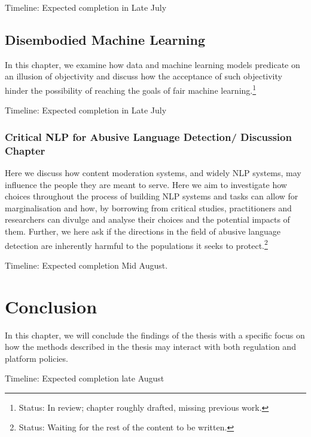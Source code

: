 {Timeline: Expected completion in Late July

\subsection{Disembodied Machine Learning}
In this chapter, we examine how data and machine learning models predicate on an illusion of objectivity and discuss how the acceptance of such objectivity hinder the possibility of reaching the goals of fair machine learning.\footnote{Status: In review; chapter roughly drafted, missing previous work.}

Timeline: Expected completion in Late July

\subsubsection{Critical NLP for Abusive Language Detection/ Discussion Chapter}
Here we discuss how content moderation systems, and widely NLP systems, may influence the people they are meant to serve. Here we aim to investigate how choices throughout the process of building NLP systems and tasks can allow for marginalisation and how, by borrowing from critical studies, practitioners and researchers can divulge and analyse their choices and the potential impacts of them. Further, we here ask if the directions in the field of abusive language detection are inherently harmful to the populations it seeks to protect.\footnote{Status: Waiting for the rest of the content to be written.}

Timeline: Expected completion Mid August.

\section{Conclusion}
In this chapter, we will conclude the findings of the thesis with a specific focus on how the methods described in the thesis may interact with both regulation and platform policies.

Timeline: Expected completion late August
}